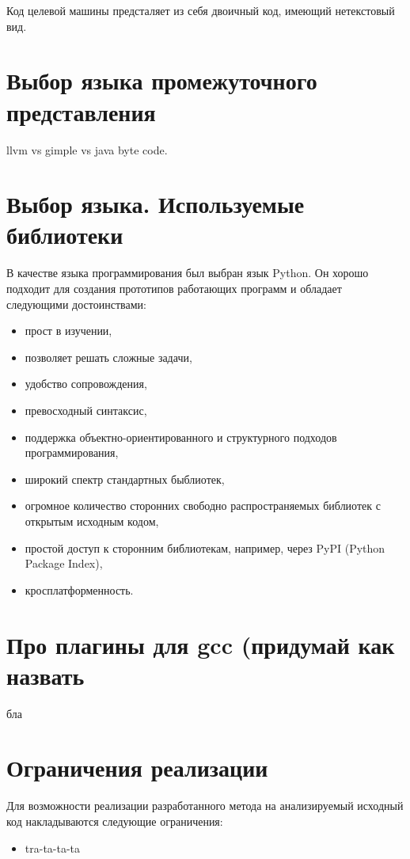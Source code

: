 Код целевой машины предсталяет из себя двоичный код, имеющий нетекстовый вид.

\section{Выбор языка промежуточного представления}

llvm vs gimple vs java byte code.


\section{Выбор языка. Используемые библиотеки}

В качестве языка программирования был выбран язык Python. Он хорошо подходит для создания прототипов работающих программ и обладает следующими достоинствами:
\begin{itemize}
  \item прост в изучении,
  \item позволяет решать сложные задачи,
  \item удобство сопровождения,
  \item превосходный синтаксис,
  \item поддержка объектно-ориентированного и структурного подходов программирования,
  \item широкий спектр стандартных быблиотек,
  \item огромное количество сторонних свободно распространяемых библиотек с открытым исходным кодом,
  \item простой доступ к сторонним библиотекам, например, через PyPI (Python Package Index), 
  \item кросплатформенность.
\end{itemize}


\section{Про плагины для gcc (придумай как назвать}
бла

\section{Ограничения реализации}

Для возможности реализации разработанного метода на анализируемый исходный код накладываются следующие ограничения:
\begin{itemize}
  \item tra-ta-ta-ta
\end{itemize}

